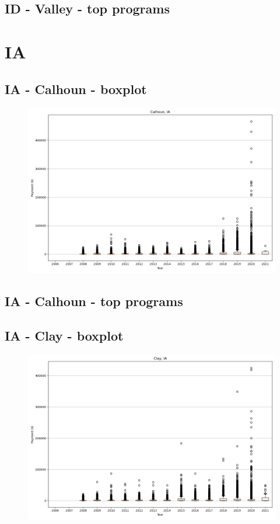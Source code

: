 \subsection*{ID - Valley - top programs}

\newpage
\section*{IA}
\subsection*{IA - Calhoun - boxplot}
\begin{figure}[h]
\centering
\includegraphics[width=7in]{../output/boxplots/counties/Calhoun-IA_boxplot.png}
\end{figure}


\subsection*{IA - Calhoun - top programs}

\newpage
\subsection*{IA - Clay - boxplot}
\begin{figure}[h]
\centering
\includegraphics[width=7in]{../output/boxplots/counties/Clay-IA_boxplot.png}
\end{figure}


